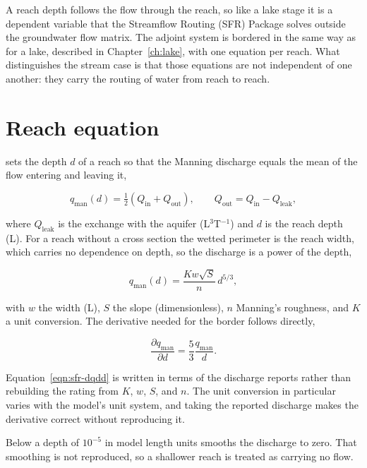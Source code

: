 A reach depth follows the flow through the reach, so like a lake stage it is a dependent variable that the Streamflow Routing (SFR) Package solves outside the groundwater flow matrix. The adjoint system is bordered in the same way as for a lake, described in Chapter~\ref{ch:lake}, with one equation per reach. What distinguishes the stream case is that those equations are not independent of one another: they carry the routing of water from reach to reach.

\section*{Reach equation}

\mf{} sets the depth $d$ of a reach so that the Manning discharge equals the mean of the flow entering and leaving it,

\begin{equation}
	\label{eqn:sfr-balance}
	q_{\mathrm{man}}(d) = \tfrac{1}{2}\left( Q_{\mathrm{in}} +
	Q_{\mathrm{out}} \right), \qquad
	Q_{\mathrm{out}} = Q_{\mathrm{in}} - Q_{\mathrm{leak}},
\end{equation}

\noindent where $Q_{\mathrm{leak}}$ is the exchange with the aquifer (L$^{3}$T$^{-1}$) and $d$ is the reach depth (L). For a reach without a cross section the wetted perimeter is the reach width, which carries no dependence on depth, so the discharge is a power of the depth,

\begin{equation}
	\label{eqn:sfr-manning}
	q_{\mathrm{man}}(d) = \frac{K w \sqrt{S}}{n}\, d^{5/3},
\end{equation}

\noindent with $w$ the width (L), $S$ the slope (dimensionless), $n$ Manning's roughness, and $K$ a unit conversion. The derivative needed for the border follows directly,

\begin{equation}
	\label{eqn:sfr-dqdd}
	\frac{\partial q_{\mathrm{man}}}{\partial d} = \frac{5}{3}
	\frac{q_{\mathrm{man}}}{d}.
\end{equation}

Equation~\ref{eqn:sfr-dqdd} is written in terms of the discharge \mf{} reports rather than rebuilding the rating from $K$, $w$, $S$, and $n$. The unit conversion in particular varies with the model's unit system, and taking the reported discharge makes the derivative correct without reproducing it.

Below a depth of $10^{-5}$ in model length units \mf{} smooths the discharge to zero. That smoothing is not reproduced, so a shallower reach is treated as carrying no flow.


